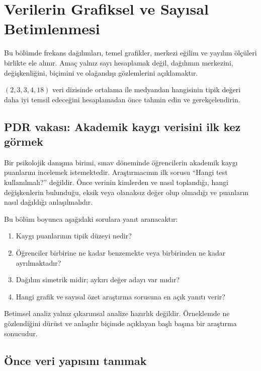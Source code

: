 \chapter{Verilerin Grafiksel ve Sayısal Betimlenmesi}

\begin{hedefler}
Bu bölümde frekans dağılımları, temel grafikler, merkezi eğilim ve yayılım
ölçüleri birlikte ele alınır. Amaç yalnız sayı hesaplamak değil, dağılımın
merkezini, değişkenliğini, biçimini ve olağandışı gözlemlerini açıklamaktır.
\end{hedefler}

\begin{hazirlik}
$(2,3,3,4,18)$ veri dizisinde ortalama ile medyandan hangisinin tipik değeri
daha iyi temsil edeceğini hesaplamadan önce tahmin edin ve gerekçelendirin.
\end{hazirlik}

\section{PDR vakası: Akademik kaygı verisini ilk kez görmek}

Bir psikolojik danışma birimi, sınav döneminde öğrencilerin akademik kaygı
puanlarını incelemek istemektedir. Araştırmacının ilk sorusu ``Hangi test
kullanılmalı?'' değildir. Önce verinin kimlerden ve nasıl toplandığı, hangi
değişkenlerin bulunduğu, eksik veya olanaksız değer olup olmadığı ve puanların
nasıl dağıldığı anlaşılmalıdır.

Bu bölüm boyunca aşağıdaki sorulara yanıt aranacaktır:

\begin{enumerate}
  \item Kaygı puanlarının tipik düzeyi nedir?
  \item Öğrenciler birbirine ne kadar benzemekte veya birbirinden ne kadar ayrılmaktadır?
  \item Dağılım simetrik midir; aykırı değer adayı var mıdır?
  \item Hangi grafik ve sayısal özet araştırma sorusuna en açık yanıtı verir?
\end{enumerate}

Betimsel analiz yalnız çıkarımsal analize hazırlık değildir. Örneklemde ne
gözlendiğini dürüst ve anlaşılır biçimde açıklayan başlı başına bir araştırma
sonucudur.

\section{Önce veri yapısını tanımak}

